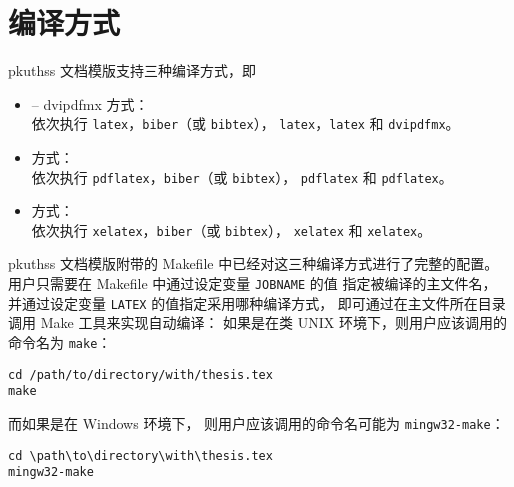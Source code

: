 	\section{编译方式}\label{sec:compile}

	pkuthss 文档模版支持三种编译方式，即
	\begin{itemize}
		\item {} -- dvipdfmx 方式：\\
			依次执行 \verb|latex|，\verb|biber|（或 \verb|bibtex|），%
			\verb|latex|，\verb|latex| 和 \verb|dvipdfmx|。
		\item {} 方式：\\
			依次执行 \verb|pdflatex|，\verb|biber|（或 \verb|bibtex|），%
			\verb|pdflatex| 和 \verb|pdflatex|。
		\item {} 方式：\\
			依次执行 \verb|xelatex|，\verb|biber|（或 \verb|bibtex|），%
			\verb|xelatex| 和 \verb|xelatex|。
	\end{itemize}


	pkuthss 文档模版附带的 Makefile 中已经对这三种编译方式进行了完整的配置。
	用户只需要在 Makefile 中通过设定变量 \verb|JOBNAME| 的值%
	指定被编译的主文件名，
	并通过设定变量 \verb|LATEX| 的值指定采用哪种编译方式，
	即可通过在主文件所在目录调用 Make 工具来实现自动编译：
	如果是在类 UNIX 环境下，则用户应该调用的命令名为 \verb|make|：
\begin{Verbatim}[frame = single]
cd /path/to/directory/with/thesis.tex
make
\end{Verbatim}
	而如果是在 Windows 环境下，
	则用户应该调用的命令名可能为 \verb|mingw32-make|：
\begin{Verbatim}[frame = single]
cd \path\to\directory\with\thesis.tex
mingw32-make
\end{Verbatim}

